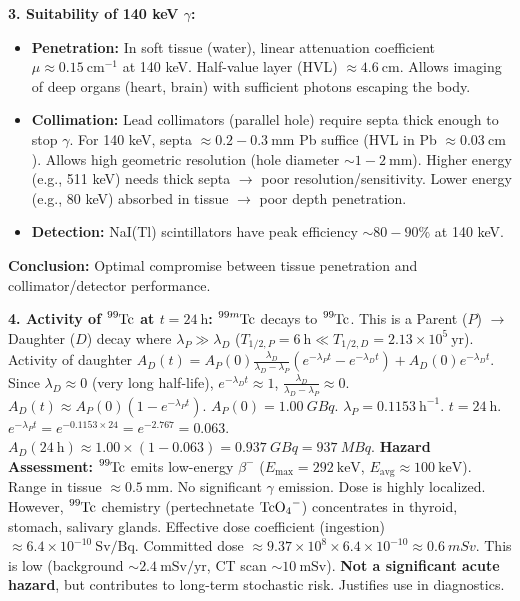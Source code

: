 \documentclass[11pt]{article}
\begin{document}
\begin{exoresolu}
\textbf{3. Suitability of 140 keV $\gamma$:}
\begin{itemize}
\item \textbf{Penetration:} In soft tissue (water), linear attenuation coefficient $\mu \approx 0.15\ \text{cm}^{-1}$ at 140 keV. Half-value layer (HVL) $\approx 4.6\ \text{cm}$. Allows imaging of deep organs (heart, brain) with sufficient photons escaping the body.
\item \textbf{Collimation:} Lead collimators (parallel hole) require septa thick enough to stop $\gamma$. For 140 keV, septa $\approx 0.2-0.3\ \text{mm}$ Pb suffice (HVL in Pb $\approx 0.03\ \text{cm}$). Allows high geometric resolution (hole diameter $\sim 1-2\ \text{mm}$). Higher energy (e.g., 511 keV) needs thick septa $\to$ poor resolution/sensitivity. Lower energy (e.g., 80 keV) absorbed in tissue $\to$ poor depth penetration.
\item \textbf{Detection:} NaI(Tl) scintillators have peak efficiency $\sim 80-90\%$ at 140 keV.
\end{itemize}
\textbf{Conclusion:} Optimal compromise between tissue penetration and collimator/detector performance.

\textbf{4. Activity of $\ce{^{99}Tc}$ at $t=24\ \text{h}$:}
$\ce{^{99m}Tc}$ decays to $\ce{^{99}Tc}$. This is a Parent ($P$) $\to$ Daughter ($D$) decay where $\lambda_P \gg \lambda_D$ ($T_{1/2,P}=6\ \text{h} \ll T_{1/2,D}=2.13\times 10^5\ \text{yr}$).
Activity of daughter $A_D(t) = A_P(0) \frac{\lambda_D}{\lambda_D - \lambda_P} (e^{-\lambda_P t} - e^{-\lambda_D t}) + A_D(0) e^{-\lambda_D t}$.
Since $\lambda_D \approx 0$ (very long half-life), $e^{-\lambda_D t} \approx 1$, $\frac{\lambda_D}{\lambda_D - \lambda_P} \approx 0$.
$A_D(t) \approx A_P(0) (1 - e^{-\lambda_P t})$.
$A_P(0) = \SI{1.00}{GBq}$. $\lambda_P = 0.1153\ \text{h}^{-1}$. $t=24\ \text{h}$.
$e^{-\lambda_P t} = e^{-0.1153 \times 24} = e^{-2.767} = 0.063$.
$A_D(24\ \text{h}) \approx 1.00 \times (1 - 0.063) = \SI{0.937}{GBq} = \SI{937}{MBq}$.
\textbf{Hazard Assessment:}
$\ce{^{99}Tc}$ emits low-energy $\beta^-$ ($E_{\text{max}}=292\ \text{keV}$, $E_{\text{avg}} \approx 100\ \text{keV}$). Range in tissue $\approx 0.5\ \text{mm}$. No significant $\gamma$ emission.
Dose is highly localized. However, $\ce{^{99}Tc}$ chemistry (pertechnetate $\ce{TcO4-}$) concentrates in thyroid, stomach, salivary glands.
Effective dose coefficient (ingestion) $\approx 6.4 \times 10^{-10}\ \text{Sv/Bq}$.
Committed dose $\approx 9.37 \times 10^8 \times 6.4 \times 10^{-10} \approx \SI{0.6}{mSv}$.
This is low (background $\sim 2.4\ \text{mSv/yr}$, CT scan $\sim 10\ \text{mSv}$). \textbf{Not a significant acute hazard}, but contributes to long-term stochastic risk. Justifies use in diagnostics.
\end{exoresolu}
\end{document}
